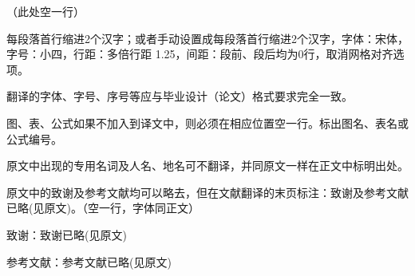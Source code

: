 
\label{chap01}
\linespread{1.25}
（此处空一行）

每段落首行缩进2个汉字；或者手动设置成每段落首行缩进2个汉字，字体：宋体，字号：小四，行距：多倍行距 1.25，间距：段前、段后均为0行，取消网格对齐选项。

翻译的字体、字号、序号等应与毕业设计（论文）格式要求完全一致。

图、表、公式如果不加入到译文中，则必须在相应位置空一行。标出图名、表名或公式编号。

原文中出现的专用名词及人名、地名可不翻译，并同原文一样在正文中标明出处。

原文中的致谢及参考文献均可以略去，但在文献翻译的末页标注：致谢及参考文献已略(见原文)。（空一行，字体同正文）

致谢：致谢已略(见原文)

参考文献：参考文献已略(见原文)

